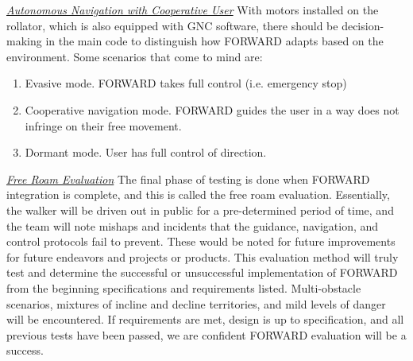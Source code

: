 \noindent \underline{\textit{Autonomous Navigation with Cooperative User}}
\noindent With motors installed on the rollator, which is also equipped with GNC software, there should be decision-making in the main code to distinguish how FORWARD adapts based on the environment. Some scenarios that come to mind are:
\begin{enumerate}
	\item Evasive mode. FORWARD takes full control (i.e. emergency stop)
	\item Cooperative navigation mode. FORWARD guides the user in a way does not infringe on their free movement.
	\item Dormant mode. User has full control of direction.
\end{enumerate}

\noindent \underline{\textit{Free Roam Evaluation}}
\noindent The final phase of testing is done when FORWARD integration is complete, and this is called the free roam evaluation. Essentially, the walker will be driven out in public for a pre-determined period of time, and the team will note mishaps and incidents that the guidance, navigation, and control protocols fail to prevent. These would be noted for future improvements for future endeavors and projects or products. This evaluation method will truly test and determine the successful or unsuccessful implementation of FORWARD from the beginning specifications and requirements listed. Multi-obstacle scenarios, mixtures of incline and decline territories, and mild levels of danger will be encountered. If requirements are met, design is up to specification, and all previous tests have been passed, we are confident FORWARD evaluation will be a success.\\